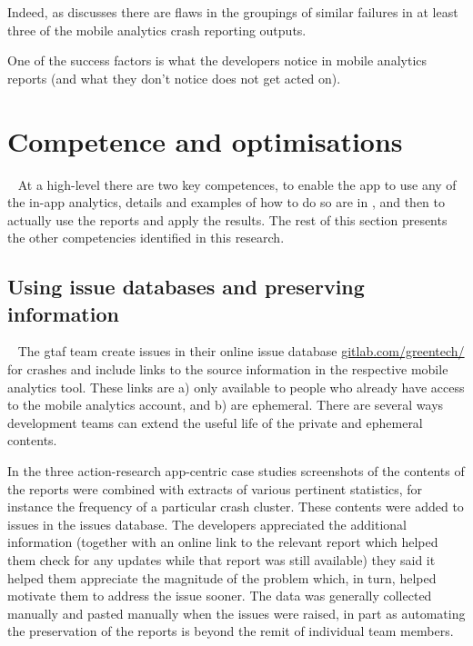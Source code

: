 Indeed, as  discusses there are flaws in the groupings of similar failures in at least three of the mobile analytics crash reporting outputs.

One of the success factors is what the developers notice in mobile analytics reports (and what they don't notice does not get acted on).


\section{Competence and optimisations}~\label{aiu-competence-and-optimisations-section}
At a high-level there are two key competences, to enable the app to use any of the in-app analytics, details and examples of how to do so are in , and then to actually use the reports and apply the results. The rest of this section presents the other competencies identified in this research.

\subsection{Using issue databases and preserving information}~\label{aiu-using-issue-databases-and-preserving-information-topics}
The \Gls{gtaf} team create issues in their online issue database \href{https://gitlab.com/greentech/}{gitlab.com/greentech/} for crashes and include links to the source information in the respective mobile analytics tool. These links are a) only available to people who already have access to the mobile analytics account, and b) are ephemeral. There are several ways development teams can extend the useful life of the private and ephemeral contents. 

In the three action-research app-centric case studies screenshots of the contents of the reports were combined with extracts of various pertinent statistics, for instance the frequency of a particular crash cluster. These contents were added to issues in the issues database. The developers appreciated the additional information (together with an online link to the relevant report which helped them check for any updates while that report was still available) they said it helped them appreciate the magnitude of the problem which, in turn, helped motivate them to address the issue sooner. The data was generally collected manually and pasted manually when the issues were raised, in part as automating the preservation of the reports is beyond the remit of individual team members.

